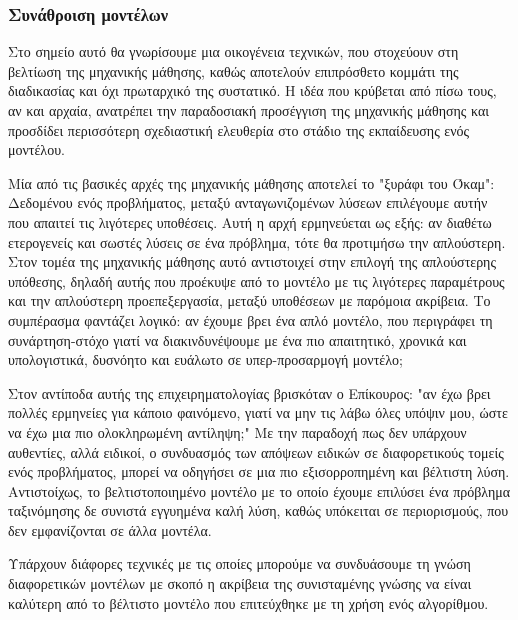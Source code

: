 \subsubsection{Συνάθροιση μοντέλων}
Στο σημείο αυτό θα γνωρίσουμε μια οικογένεια τεχνικών, που στοχεύουν στη βελτίωση της μηχανικής μάθησης, καθώς αποτελούν επιπρόσθετο κομμάτι της διαδικασίας και όχι πρωταρχικό της συστατικό. Η ιδέα που κρύβεται από πίσω τους, αν και αρχαία, ανατρέπει την παραδοσιακή προσέγγιση της μηχανικής μάθησης και προσδίδει περισσότερη σχεδιαστική ελευθερία στο στάδιο της εκπαίδευσης ενός μοντέλου.

Μία από τις βασικές αρχές της μηχανικής μάθησης αποτελεί το "ξυράφι του Όκαμ": Δεδομένου ενός προβλήματος, μεταξύ ανταγωνιζομένων λύσεων επιλέγουμε αυτήν που απαιτεί τις λιγότερες υποθέσεις. Αυτή η αρχή ερμηνεύεται ως εξής: αν διαθέτω ετερογενείς και σωστές λύσεις σε ένα πρόβλημα, τότε θα προτιμήσω την απλούστερη. Στον τομέα της μηχανικής μάθησης αυτό αντιστοιχεί στην επιλογή της απλούστερης υπόθεσης, δηλαδή αυτής που προέκυψε από το μοντέλο με τις λιγότερες
παραμέτρους και την απλούστερη προεπεξεργασία, μεταξύ υποθέσεων με παρόμοια ακρίβεια. Το συμπέρασμα φαντάζει λογικό: αν έχουμε βρει ένα απλό μοντέλο, που περιγράφει τη συνάρτηση-στόχο γιατί να διακινδυνέψουμε με ένα πιο απαιτητικό, χρονικά και υπολογιστικά, δυσνόητο και ευάλωτο σε υπερ-προσαρμογή μοντέλο;

Στον αντίποδα αυτής της επιχειρηματολογίας βρισκόταν ο Επίκουρος: "αν έχω βρει πολλές ερμηνείες για κάποιο φαινόμενο, γιατί να μην τις λάβω όλες υπόψιν μου, ώστε να έχω μια πιο ολοκληρωμένη αντίληψη;" Με την παραδοχή πως δεν υπάρχουν αυθεντίες, αλλά ειδικοί, ο συνδυασμός των απόψεων ειδικών σε διαφορετικούς τομείς ενός προβλήματος, μπορεί να οδηγήσει σε μια πιο εξισορροπημένη και βέλτιστη λύση. Αντιστοίχως, το βελτιστοποιημένο μοντέλο με το οποίο έχουμε επιλύσει ένα πρόβλημα ταξινόμησης δε συνιστά εγγυημένα καλή λύση, καθώς υπόκειται σε περιορισμούς, που δεν εμφανίζονται σε άλλα μοντέλα.

Υπάρχουν διάφορες τεχνικές με τις οποίες μπορούμε να συνδυάσουμε τη γνώση διαφορετικών μοντέλων με σκοπό η ακρίβεια της συνισταμένης γνώσης να είναι καλύτερη από το βέλτιστο μοντέλο που επιτεύχθηκε με τη χρήση ενός αλγορίθμου.

